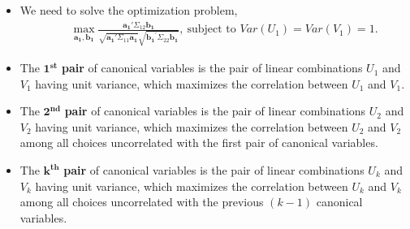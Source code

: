 \documentclass[10pt]{beamer} %
\begin{document}
\begin{frame}
	\begin{itemize}
		\item We need to solve the optimization problem,
		\begin{eqnarray}
         &&	\operatorname*{max}_{\boldsymbol{a_1},\boldsymbol{b_1}}
         \frac{\boldsymbol{a_{1}'}\Sigma_{12}\boldsymbol{b_1}}{\sqrt{\boldsymbol{a_{1}'}\Sigma_{11}\boldsymbol{a_1}}\sqrt{\boldsymbol{b_1}^{'}\Sigma_{22}\boldsymbol{b_1}}},\
         \text{subject to } Var(U_1)=Var(V_1)=1. \nonumber
		\end{eqnarray}

      \item The $\mathbf{1^{st}}$ \textbf{pair} of canonical variables is the
         pair of linear combinations $U_1$ and $V_1$ having unit variance, which
         maximizes the correlation between $U_1$ and $V_1$.

      \item The $\mathbf{2^{nd}}$ \textbf{pair} of canonical variables is the
         pair of linear combinations $U_2$ and $V_2$ having unit variance, which
         maximizes the correlation between $U_2$ and $V_2$ among all choices
         uncorrelated with the first pair of canonical variables. 

      \item The $\mathbf{k^{th}}$ \textbf{pair} of canonical variables is the
         pair of linear combinations $U_k$ and $V_k$ having unit variance, which
         maximizes the correlation between $U_k$ and $V_k$ among all choices
         uncorrelated with the previous $(k-1)$ canonical variables.
	\end{itemize}    
\end{frame}
\end{document}
